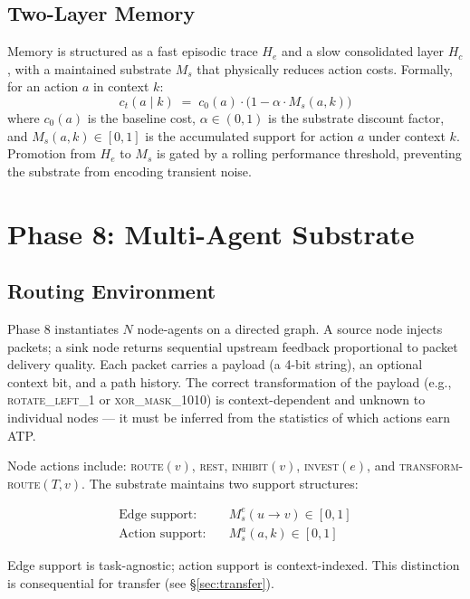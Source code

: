 \documentclass[10pt,twocolumn]{article}
\newcommand{\He}{H_e}
\newcommand{\Hc}{H_c}
\newcommand{\Ms}{M_s}
\begin{document}
\subsection{Two-Layer Memory}

Memory is structured as a fast episodic trace $\He$ and a slow consolidated
layer $\Hc$, with a maintained substrate $\Ms$ that physically reduces
action costs.
Formally, for an action $a$ in context $k$:
\[
  c_t(a \mid k) \;=\; c_0(a) \cdot \bigl(1 - \alpha \cdot \Ms(a, k)\bigr)
\]
where $c_0(a)$ is the baseline cost, $\alpha \in (0,1)$ is the substrate
discount factor, and $\Ms(a,k) \in [0,1]$ is the accumulated support for
action $a$ under context $k$.
Promotion from $\He$ to $\Ms$ is gated by a rolling performance threshold,
preventing the substrate from encoding transient noise.

\section{Phase 8: Multi-Agent Substrate}
\label{sec:phase8}

\subsection{Routing Environment}

Phase 8 instantiates $N$ node-agents on a directed graph.
A source node injects packets; a sink node returns sequential upstream
feedback proportional to packet delivery quality.
Each packet carries a payload (a 4-bit string), an optional context bit,
and a path history.
The correct transformation of the payload (e.g., \textsc{rotate\_left\_1} or
\textsc{xor\_mask\_1010}) is context-dependent and unknown to individual nodes
--- it must be inferred from the statistics of which actions earn ATP.

Node actions include: \textsc{route}$(v)$, \textsc{rest},
\textsc{inhibit}$(v)$, \textsc{invest}$(e)$, and
\textsc{transform-route}$(T, v)$.
The substrate maintains two support structures:

\begin{align}
  \text{Edge support:}\quad & \Ms^e(u \to v) \in [0,1] \\
  \text{Action support:}\quad & \Ms^a(a, k) \in [0,1]
\end{align}

Edge support is task-agnostic; action support is context-indexed.
This distinction is consequential for transfer (see \S\ref{sec:transfer}).
\end{document}

